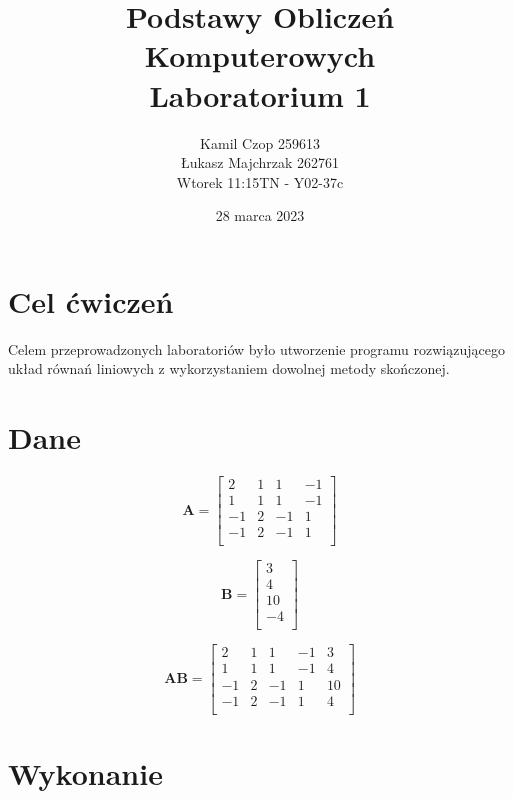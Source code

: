 \documentclass{article}
\title{Podstawy Obliczeń Komputerowych\\ Laboratorium 1}
\author{Kamil Czop 259613 \\ Łukasz Majchrzak 262761 \\ Wtorek 11:15TN - Y02-37c}
\date{28 marca 2023}
\begin{document}
\maketitle

\section{Cel ćwiczeń}
Celem przeprowadzonych laboratoriów było utworzenie programu rozwiązującego układ równań liniowych z wykorzystaniem dowolnej metody skończonej.
\section{Dane}
\begin{figure}[H]
    \begin{multicols}{3}
        \begin{equation*}
         \mathbf{A}=\begin{bmatrix}2 & 1 & 1 & -1\\1 & 1 & 1 & -1\\ -1 & 2 & -1 & 1 \\ -1 & 2 & -1 & 1 \\\end{bmatrix}
        \end{equation*}
    \par
        \begin{equation*}
         \mathbf{B}=\begin{bmatrix}3 \\ 4 \\ 10 \\ -4\\\end{bmatrix}
        \end{equation*}
    \par
        \begin{equation*}
         \mathbf{AB}=\begin{bmatrix}2 & 1 & 1 & -1 & 3\\1 & 1 & 1 & -1 & 4\\ -1 & 2 & -1 & 1 & 10\\ -1 & 2 & -1 & 1 & 4\\\end{bmatrix}
        \end{equation*}
    \end{multicols}
\end{figure}

\section{Wykonanie} 
\end{document}
